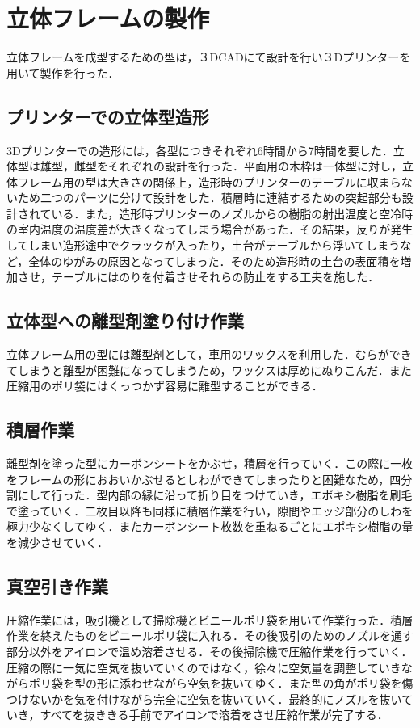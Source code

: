 \documentclass[twocolumn,11pt]{abst}
\begin{document}
\section{立体フレームの製作}
立体フレームを成型するための型は，３DCADにて設計を行い３Dプリンターを用いて製作を行った．

\subsection{プリンターでの立体型造形}
3Dプリンターでの造形には，各型につきそれぞれ6時間から7時間を要した．立体型は雄型，雌型をそれぞれの設計を行った．平面用の木枠は一体型に対し，立体フレーム用の型は大きさの関係上，造形時のプリンターのテーブルに収まらないため二つのパーツに分けて設計をした．積層時に連結するための突起部分も設計されている．また，造形時プリンターのノズルからの樹脂の射出温度と空冷時の室内温度の温度差が大きくなってしまう場合があった．その結果，反りが発生してしまい造形途中でクラックが入ったり，土台がテーブルから浮いてしまうなど，全体のゆがみの原因となってしまった．そのため造形時の土台の表面積を増加させ，テーブルにはのりを付着させそれらの防止をする工夫を施した．

\subsection{立体型への離型剤塗り付け作業}
立体フレーム用の型には離型剤として，車用のワックスを利用した．むらができてしまうと離型が困難になってしまうため，ワックスは厚めにぬりこんだ．また圧縮用のポリ袋にはくっつかず容易に離型することができる．

\subsection{積層作業}
離型剤を塗った型にカーボンシートをかぶせ，積層を行っていく．この際に一枚をフレームの形におおいかぶせるとしわができてしまったりと困難なため，四分割にして行った．型内部の縁に沿って折り目をつけていき，エポキシ樹脂を刷毛で塗っていく．二枚目以降も同様に積層作業を行い，隙間やエッジ部分のしわを極力少なくしてゆく．またカーボンシート枚数を重ねるごとにエポキシ樹脂の量を減少させていく．


\subsection{真空引き作業}
圧縮作業には，吸引機として掃除機とビニールポリ袋を用いて作業行った．積層作業を終えたものをビニールポリ袋に入れる．その後吸引のためのノズルを通す部分以外をアイロンで温め溶着させる．その後掃除機で圧縮作業を行っていく．圧縮の際に一気に空気を抜いていくのではなく，徐々に空気量を調整していきながらポリ袋を型の形に添わせながら空気を抜いてゆく．また型の角がポリ袋を傷つけないかを気を付けながら完全に空気を抜いていく．最終的にノズルを抜いていき，すべてを抜ききる手前でアイロンで溶着をさせ圧縮作業が完了する．
\end{document}
